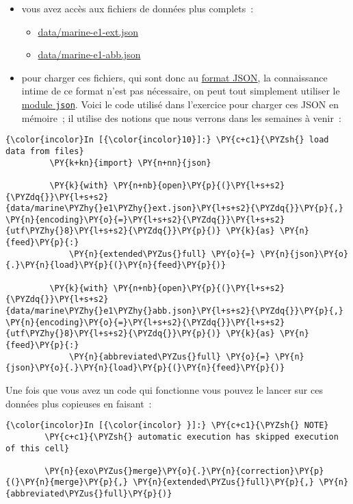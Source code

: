 \begin{itemize}
\tightlist
\item
  vous avez accès aux fichiers de données plus complets~:

  \begin{itemize}
  \tightlist
  \item
    \url{data/marine-e1-ext.json}
  \item
    \url{data/marine-e1-abb.json}
  \end{itemize}
\item
  pour charger ces fichiers, qui sont donc au
  \href{http://en.wikipedia.org/wiki/JSON}{format JSON}, la connaissance
  intime de ce format n'est pas nécessaire, on peut tout simplement
  utiliser le \href{https://docs.python.org/3/library/json.html}{module
  \texttt{json}}. Voici le code utilisé dans l'exercice pour charger ces
  JSON en mémoire~; il utilise des notions que nous verrons dans les
  semaines à venir~:
\end{itemize}

    \begin{Verbatim}[commandchars=\\\{\}]
{\color{incolor}In [{\color{incolor}10}]:} \PY{c+c1}{\PYZsh{} load data from files}
         \PY{k+kn}{import} \PY{n+nn}{json}
         
         \PY{k}{with} \PY{n+nb}{open}\PY{p}{(}\PY{l+s+s2}{\PYZdq{}}\PY{l+s+s2}{data/marine\PYZhy{}e1\PYZhy{}ext.json}\PY{l+s+s2}{\PYZdq{}}\PY{p}{,} \PY{n}{encoding}\PY{o}{=}\PY{l+s+s2}{\PYZdq{}}\PY{l+s+s2}{utf\PYZhy{}8}\PY{l+s+s2}{\PYZdq{}}\PY{p}{)} \PY{k}{as} \PY{n}{feed}\PY{p}{:}
             \PY{n}{extended\PYZus{}full} \PY{o}{=} \PY{n}{json}\PY{o}{.}\PY{n}{load}\PY{p}{(}\PY{n}{feed}\PY{p}{)}
         
         \PY{k}{with} \PY{n+nb}{open}\PY{p}{(}\PY{l+s+s2}{\PYZdq{}}\PY{l+s+s2}{data/marine\PYZhy{}e1\PYZhy{}abb.json}\PY{l+s+s2}{\PYZdq{}}\PY{p}{,} \PY{n}{encoding}\PY{o}{=}\PY{l+s+s2}{\PYZdq{}}\PY{l+s+s2}{utf\PYZhy{}8}\PY{l+s+s2}{\PYZdq{}}\PY{p}{)} \PY{k}{as} \PY{n}{feed}\PY{p}{:}
             \PY{n}{abbreviated\PYZus{}full} \PY{o}{=} \PY{n}{json}\PY{o}{.}\PY{n}{load}\PY{p}{(}\PY{n}{feed}\PY{p}{)}
\end{Verbatim}


    Une fois que vous avez un code qui fonctionne vous pouvez le lancer sur
ces données plus copieuses en faisant~:

    \begin{Verbatim}[commandchars=\\\{\}]
{\color{incolor}In [{\color{incolor} }]:} \PY{c+c1}{\PYZsh{} NOTE}
        \PY{c+c1}{\PYZsh{} automatic execution has skipped execution of this cell}
        
        \PY{n}{exo\PYZus{}merge}\PY{o}{.}\PY{n}{correction}\PY{p}{(}\PY{n}{merge}\PY{p}{,} \PY{n}{extended\PYZus{}full}\PY{p}{,} \PY{n}{abbreviated\PYZus{}full}\PY{p}{)}
\end{Verbatim}



    
    
    
